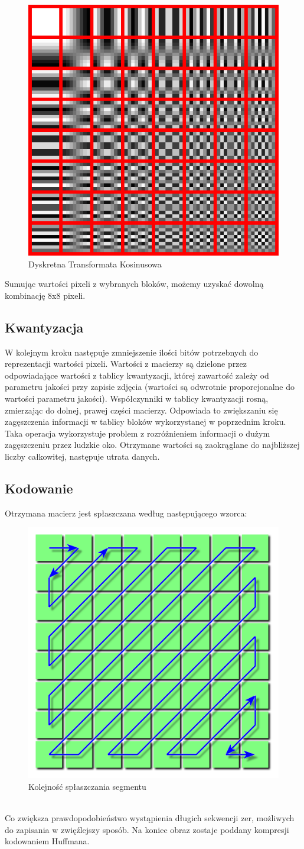 \documentclass[a4paper,11pt]{article}
\begin{document}
\begin{figure}[h!]
	\begin{center}
	\includegraphics[width=0.5\columnwidth]{DCT.png}
	\caption{Dyskretna Transformata Kosinusowa}
\end{center}
\end{figure}
Sumując wartości pixeli z wybranych bloków, możemy uzyskać dowolną kombinację 8x8 pixeli.
\subsection{Kwantyzacja}
W kolejnym kroku następuje zmniejszenie ilości bitów potrzebnych do reprezentacji wartości pixeli.
Wartości z macierzy są dzielone przez odpowiadające wartości z tablicy kwantyzacji,
której zawartość zależy od parametru jakości przy zapisie zdjęcia (wartości są odwrotnie proporcjonalne do wartości parametru jakości).
Współczynniki w tablicy kwantyzacji rosną, zmierzając do dolnej, prawej części macierzy.
Odpowiada to zwiększaniu się zagęszczenia informacji w tablicy bloków wykorzystanej w poprzednim kroku.
Taka operacja wykorzystuje problem z rozróżnieniem informacji o dużym zagęszczeniu przez ludzkie oko.
Otrzymane wartości są zaokrąglane do najbliższej liczby całkowitej, następuje utrata danych.
\subsection{Kodowanie}
Otrzymana macierz jest spłaszczana według następującego wzorca:
\begin{figure}[h!]
	\begin{center}
	\includegraphics[width=0.5\columnwidth]{pattern.png}
	\caption{Kolejność spłaszczania segmentu}
\end{center}
\end{figure}
\\
Co zwiększa prawdopodobieństwo wystąpienia długich sekwencji zer, możliwych do zapisania w zwięźlejszy sposób.
Na koniec obraz zostaje poddany kompresji kodowaniem Huffmana.
\newpage
\end{document}
